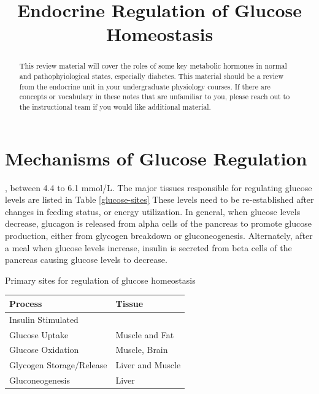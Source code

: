 \documentclass{tufte-handout}
\title{Endocrine Regulation of Glucose Homeostasis}
\author{}
\date{}  %
\begin{document}
\maketitle%

\begin{abstract}
\noindent This review material will cover the roles of some key metabolic hormones in normal and pathophyiological states, especially diabetes.  This material should be a review from the endocrine unit in your undergraduate physiology courses.  If there are concepts or vocabulary in these notes that are unfamiliar to you, please reach out to the instructional team if you would like additional material.
\end{abstract}

\tableofcontents


\pagebreak

\section{Mechanisms of Glucose Regulation}

, between 4.4 to 6.1 mmol/L.  The major tissues responsible for regulating glucose levels are listed in Table \ref{glucose-sites} These levels need to be re-established after changes in feeding status, or energy utilization.  In general, when glucose levels decrease, glucagon is released from alpha cells of the pancreas to promote glucose production, either from glycogen breakdown or gluconeogenesis.  Alternately, after a meal when glucose levels increase, insulin is secreted from beta cells of the pancreas causing glucose levels to decrease.

\begin{margintable}
\caption{Primary sites for regulation of glucose homeostasis}
\label{glucose-sites}
\begin{tabular}{@{}ll@{}}
\textbf{Process }                          & \textbf{Tissue}           \\ \midrule
Insulin Stimulated \\Glucose Uptake & Muscle and Fat   \\ \midrule
Glucose Oxidation & Muscle, Brain \\ \midrule
Glycogen Storage/Release                      & Liver and Muscle \\ \midrule
Gluconeogenesis & Liver \\ \bottomrule
\end{tabular}
\end{margintable}
\end{document}
